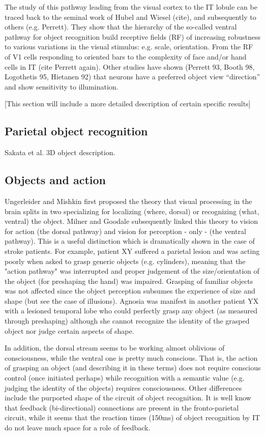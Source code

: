The study of this pathway leading from the visual cortex to the IT lobule can be traced back to the seminal work of Hubel and Wiesel (cite), and subsequently to others (e.g. Perrett). They show that the hierarchy of the so-called ventral pathway for object recognition build receptive fields (RF) of increasing robustness to various variations in the visual stimulus: e.g. scale, orientation. From the RF of V1 cells responding to oriented bars to the complexity of face and/or hand cells in IT (cite Perrett again). Other studies have shown (Perrett 93, Booth 98, Logothetis 95, Hietanen 92) that neurons have a preferred object view ``direction'' and show sensitivity to illumination.

[This section will include a more detailed description of certain specific results]

\subsection{Parietal object recognition}

Sakata et al. 3D object description.

\subsection{Objects and action}

Ungerleider and Mishkin first proposed the theory that visual processing in the brain splits in two specializing for localizing (where, dorsal) or recognizing (what, ventral) the object. Milner and Goodale subsequently linked this theory to vision for action (the dorsal pathway) and vision for perception - only - (the ventral pathway). This is a useful distinction which is dramatically shown in the case of stroke patients. For example, patient XY suffered a parietal lesion and was acting poorly when asked to grasp generic objects (e.g. cylinders), meaning that the "action pathway" was interrupted and proper judgement of the size/orientation of the object (for preshaping the hand) was impaired. Grasping of familiar objects was not affected since the object perception subsumes the experience of size and shape (but see the case of illusions). Agnosia was manifest in another patient YX with a lesioned temporal lobe who could perfectly grasp any object (as measured through preshaping) although she cannot recognize the identity of the grasped object nor judge certain aspects of shape.

In addition, the dorsal stream seems to be working almost oblivious of consciousness, while the ventral one is pretty much conscious. That is, the action of grasping an object (and describing it in these terms) does not require conscious control (once initiated perhaps) while recognition with a semantic value (e.g. judging the identity of the objects) requires consciousness. Other differences include the purported shape of the circuit of object recognition. It is well know that feedback (bi-directional) connections are present in the fronto-parietal circuit, while it seems that the reaction times (150ms) of object recognition by IT do not leave much space for a role of feedback.

